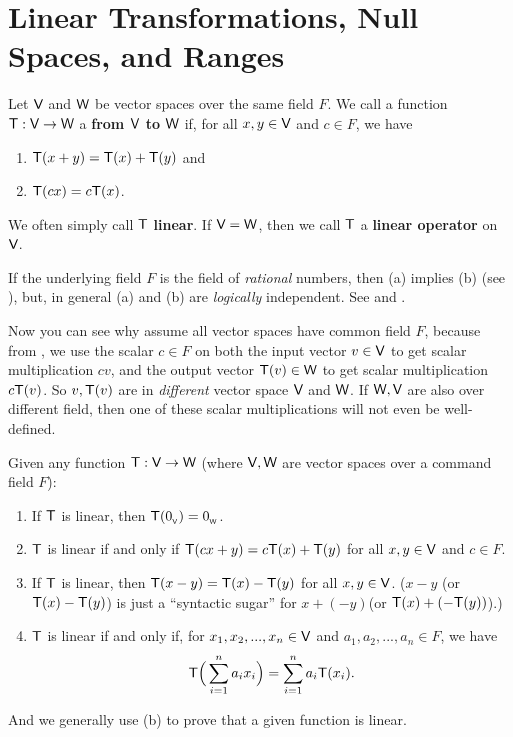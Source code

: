 \section{Linear Transformations, Null Spaces, and Ranges} \label{sec 2.1}

\begin{definition} \label{def 2.1}
Let \(\textsf{V}\) and \(\textsf{W}\) be vector spaces over the same field \(F\).
We call a function \(\textsf{T}: \textsf{V} \to \textsf{W}\) a \textbf{\LTRAN{} from \(\textsf{V}\) to \(\textsf{W}\)} if, for all \(x, y \in \textsf{V}\) and \(c \in F\), we have
\begin{enumerate}
\item \(\textsf{T}(x + y) = \textsf{T}(x) + \textsf{T}(y)\) and
\item \(\textsf{T}(cx) = c\textsf{T}(x)\).
\end{enumerate}
We often simply call \(\textsf{T}\) \textbf{linear}.
If \(\textsf{V} = \textsf{W}\), then we call \(\textsf{T}\) a \textbf{linear operator} on \(\textsf{V}\).
\end{definition}

\begin{remark} \label{remark 2.1.1}
If the underlying field \(F\) is the field of \emph{rational} numbers, then  (a) implies (b) (see ),
but, in general (a) and (b) are \emph{logically} independent.
See  and .
\end{remark}

\begin{remark} \label{remark 2.1.2}
Now you can see why  assume all vector spaces have common field \(F\), because from , we use the scalar \(c \in F\) on both the input vector \(v \in \textsf{V}\) to get scalar multiplication \(c v\), and the output vector \(\textsf{T}(v) \in \textsf{W}\) to get scalar multiplication \(c \textsf{T}(v)\).
So \(v, \textsf{T}(v)\) are in \emph{different} vector space \(\textsf{V}\) and \(\textsf{W}\).
If \(\textsf{W}, \textsf{V}\) are also over different field, then one of these scalar multiplications will not even be well-defined.
\end{remark}

\begin{additional theorem} \label{athm 2.1}
Given any function \(\textsf{T} : \textsf{V} \to \textsf{W}\) (where \(\textsf{V}, \textsf{W}\) are vector spaces over a command field \(F\)):
\begin{enumerate}
\item If \(\textsf{T}\) is linear, then \(\textsf{T}(0_{_{\textsf{V}}}) = 0_{_{\textsf{W}}}\).
\item \(\textsf{T}\) is linear if and only if \(\textsf{T}(cx + y) = c\textsf{T}(x) + \textsf{T}(y)\) for all \(x, y \in \textsf{V}\) and \(c \in F\).
\item If \(\textsf{T}\) is linear, then \(\textsf{T}(x - y) = \textsf{T}(x) - \textsf{T}(y)\) for all \(x, y \in \textsf{V}\).
    (\(x - y\) (or \(\textsf{T}(x) - \textsf{T}(y)\)) is just a ``syntactic sugar'' for \(x + (-y)\)(or \(\textsf{T}(x) + (-\textsf{T}(y))\)).)
\item \(\textsf{T}\) is linear if and only if, for \(x_1, x_2, ..., x_n \in \textsf{V}\) and \(a_1, a_2, ..., a_n \in F\), we have
\[
    \textsf{T} \Big( \sum_{i = 1}^{n} a_i x_i \Big) = \sum_{i = 1}^{n} a_i \textsf{T}(x_i).
\]
\end{enumerate}
And we generally use (b) to prove that a given function is linear.
\end{additional theorem}

